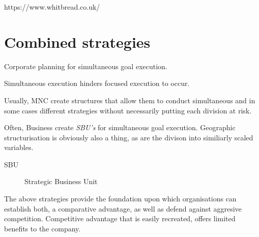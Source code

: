 \documentclass{article}
\begin{document}
https://www.whitbread.co.uk/


\section{Combined strategies}


Corporate planning for simultaneous goal execution.


Simultaneous execution hinders focused execution to occur.


Usually, MNC create structures that allow them to conduct simultaneous and in some cases different strategies without necessarily putting each division at risk.

Often, Business create \textit{SBU's} for simultaneous goal execution. 
Geographic structurisation is obviously also a thing, as are the divison into similiarly scaled variables.

\begin{description}
  \item [SBU] Strategic Business Unit
\end{description}

The above strategies provide the foundation upon which organisations can establish both, a comparative advantage, as well as defend against aggresive competition.
Competitive advantage that is easily recreated, offers limited benefits to the company. 
\end{document}
